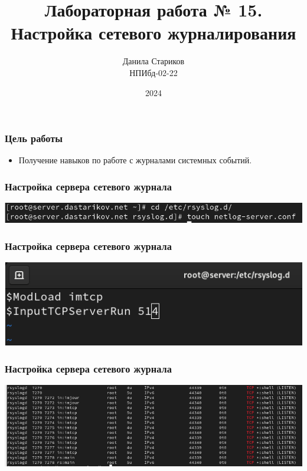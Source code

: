 

\title{Лабораторная работа № 15. \\ Настройка сетевого журналирования}
\author{Данила Стариков \\ НПИбд-02-22}
\date{2024}



\frame{\titlepage}

\begin{frame}
\frametitle{Цель работы}
\begin{itemize}
    \item Получение навыков по работе с журналами системных событий.
\end{itemize}
\end{frame}

\begin{frame}
\frametitle{Настройка сервера сетевого журнала}
    \centering
    \includegraphics[width=\textwidth]{../images/image01.png}
\end{frame}


\begin{frame}
\frametitle{Настройка сервера сетевого журнала}
    \centering
    \includegraphics[width=\textwidth]{../images/image02.png}
\end{frame}


\begin{frame}
\frametitle{Настройка сервера сетевого журнала}
    \centering
    \includegraphics[width=\textwidth]{../images/image03.png}
\end{frame}


